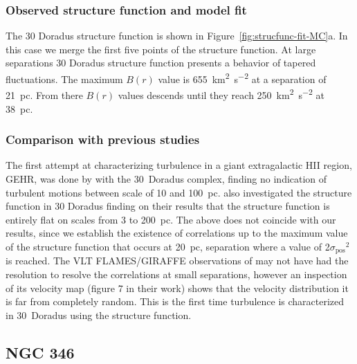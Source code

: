 \documentclass[fleqn,usenatbib, useAMS, a4paper]{mnras}
\newcommand\pos{\ensuremath{_{\mathrm{pos}}}}
\begin{document}
\subsubsection{Observed structure function and model fit}
\label{sec:observ-struct-funct-30dor}

The 30 Doradus structure function is shown in Figure~\ref{fig:strucfunc-fit-MC}a.
In this case we merge the first five points of the structure function.
At large separations 30 Doradus structure function presents a behavior of tapered fluctuations. The maximum \(B(r)\) value is \SI{655}{km^{2}.s^{-2}} at a separation of \SI{21}{pc}. 
From there \(B(r)\) values descends until they reach \SI{250}{km^{2}.s^{-2}} at \SI{38}{pc}.

\subsubsection{Comparison with previous studies}
\label{sec:comparison-30dor}

The first attempt at characterizing turbulence in a giant extragalactic HII region, GEHR, was done by \citet{1961MNRAS.122....1F} with the 30~Doradus complex, finding no indication of turbulent motions between scale of \num{10} and \SI{100}{pc}.
\citet{Melnick:2021x} also investigated the structure function in 30 Doradus finding on their results that the structure function is entirely flat on scales from \num{3} to \SI{200}{pc}.
The above does not coincide with our results, since we establish the existence of correlations up to the maximum value of the structure function that occurs at \SI{20}{pc}, separation where a value of 2\(\sigma\pos^2\) is reached.
The VLT FLAMES/GIRAFFE observations of \citet{Melnick:2021x} may not have had the resolution to resolve the correlations at small separations, however an inspection of its velocity map (figure 7 in their work) shows that the velocity distribution it is far from completely random.
This is the first time turbulence is characterized in 30~Doradus using the structure function.


\subsection{NGC 346}
\label{sec:ngc-346}
\end{document}
